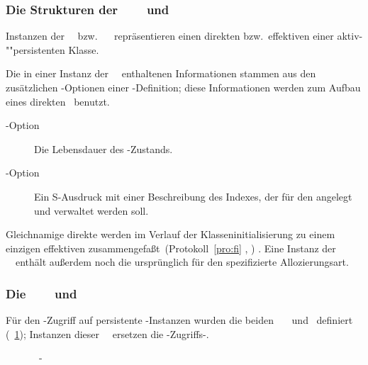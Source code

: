 \subsubsection{Die Strukturen der
\protect\spc[n]\ \protect\sltmc[n]\ %
\protect{}\ und
\protect{}}
%
Instanzen der
\sltdc[n]\ \ bzw.\ %
\ %
repr\"{a}sentieren  einen direkten bzw.\ effektiven \Slt\/ einer
ak\-tiv-""per\-si\-sten\-ten Klasse.
%
\par{}Die in einer Instanz der
\sltdc\ \ enthaltenen
Informationen stammen aus den zu\-s\"{a}tz\-li\-chen \Slt\/-Optionen
einer \Slt\/-Definition; diese Informationen werden zum Aufbau eines
direkten \sltdo[es]\ benutzt. 
%
\begin{description}
%
\item[{\Slt\/-Option }]
Die Lebensdauer des \Slt\/-Zustands.
%
\item[{\Slt\/-Option }]
Ein S-Ausdruck mit einer Beschreibung des Indexes, der f\"{u}r den
\Slt\/ angelegt und verwaltet werden soll.
%
\end{description}
%
Gleichnamige direkte \Slt[s]\/ werden im Verlauf der
Klasseninitialisierung zu einem einzigen effektiven
\Slt\/ zusammengefa\ss{}t\ifbericht\else\ (Protokoll~\ref{pro:fi}
, \citepage{\pageref{pro:fi}})%
\fi. Eine Instanz der
\sltdc\ \ enth\"{a}lt 
au\ss{}erdem noch die urspr\"{u}nglich f\"{u}r den \Slt\/ spezifizierte
Allozierungsart.
%
\subsubsection{Die \protect\spc[n]\ \protect\mtdmc[n]\ %
\protect{}\ und
\protect{}}
%
F\"{u}r den \Slt\/-Zugriff auf persistente \clos-Instanzen wurden die
beiden \spc[n]\ \mtdmc[n]\ \ und
\ definiert
(\figurename~\ref{fig:pltlacls}); Instanzen dieser
\spc[n]\ \mtdmc[n]\ ersetzen die \std-Zugriffs-\mtd[n].
%
\begin{figure}[htbp]%
\ifbuch%
\centerline{}%
\else%
\centerline{}%
\fi%
\caption{\protect\Spc\ \protect\mtd[n]-\protect\mc[n]}%
\label{fig:pltlacls}%
\end{figure}%
%
